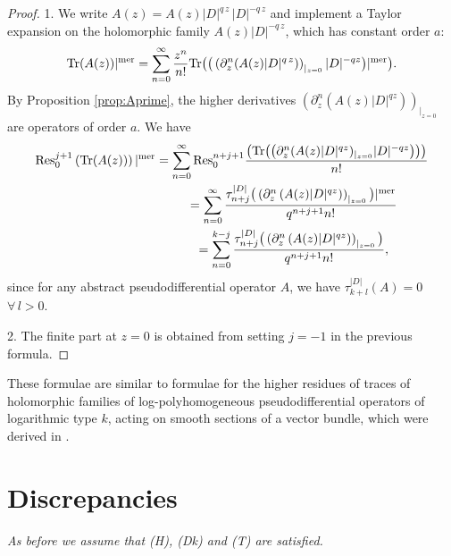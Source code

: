 \documentclass[pdftex]{sigma}
\numberwithin{equation}{section}
\begin{document}
\begin{proof}
1. We write $A(z)= A(z) \vert D\vert^{q\, z}\, \vert D\vert^{-q\, z}$ and implement
   a Taylor expansion on the holomorphic family $A(z) \vert
   D\vert^{-
q\, z}$, which has constant order $a$:
\[
{\rm Tr}(A(z))\vert^{\rm mer}= \sum_{n=0}^\infty \frac{z^n}{n!}  {\rm Tr}\big(\big(\left(\partial_z^n (A(z)
    \vert D\vert^{q\, z})\right)_{\vert_{z=0}} \vert D\vert^{-q
    z}\big)\vert^{\rm mer}\big).
    \]
By Proposition \ref{prop:Aprime}, the higher derivatives $\left(\partial_z^n
(A(z)  \vert D\vert^{q  z})\right)_{\vert_{z=0}}$ are operators of order $a$. We have
\begin{gather*}
{\rm Res}^{j+1}_{0}\left( {\rm Tr}(A(z))\right)\vert^{\rm mer} =  \sum_{n=0}^\infty {\rm Res}_0^{n+j+1} \frac{
\big( {\rm Tr}\big(\big(\partial_z^n  (A(z)
    \vert D\vert^{q z} )_{\vert_{z=0}}  \vert D\vert^{-q  z}\big)\big)\big)}{n!}\\
    \phantom{{\rm Res}^{j+1}_{0}\left( {\rm Tr}(A(z))\right)\vert^{\rm mer}}{}
 =  \sum_{n=0}^\infty\frac{ \tau^{\vert D\vert}_{n+j}
\big(\left(\partial_z^n \left(A(z) \vert D\vert^{q  z}\right)\right)_{\vert_{z=0}}\big)\vert^{\rm mer}}{q^{n+j+1}  n!}\\
\phantom{{\rm Res}^{j+1}_{0}\left( {\rm Tr}(A(z))\right)\vert^{\rm mer}}{}
 =  \sum_{n=0}^{k-j}\frac{ \tau^{\vert D\vert}_{n+j}\big(\left(\partial_z^n \left(A(z) \vert D\vert^{q  z}\right)\right)_{\vert_{z=0}}\big)}{q^{n+j+1}  n!},
\end{gather*}
since  for any abstract pseudodif\/ferential operator $A$, we have $\tau_{k+l}^{\vert D\vert}(A)=0$ $\forall\, l>0$.

2. The f\/inite part at $z=0$ is obtained from setting $j=-1$ in the
  previous formula.
\end{proof}
\begin{remark} These formulae are similar to formulae for the higher
  residues of traces of holomorphic families of log-polyhomogeneous
  pseudodif\/ferential operators of logarithmic type $k$,   acting on smooth sections of
a vector bundle, which were derived in \cite{L}.
\end{remark}


\section{Discrepancies}\label{section6}

{\it  As before we assume that   {\rm (H)},    {\rm (Dk)} and {\rm (T)} are satisfied.}
\end{document}
